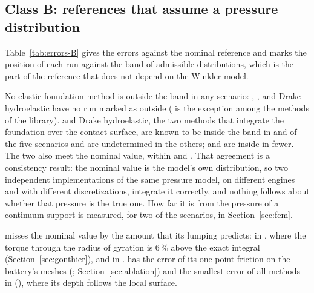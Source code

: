 \subsection{Class B: references that assume a pressure distribution}\label{sec:classB}

Table~\ref{tab:errors-B} gives the errors against the nominal reference and marks the position
of each run against the band of admissible distributions, which is the part of the reference
that does not depend on the Winkler model.

\begin{table}[t]
\caption{Class B: error [\%] against the nominal reference, base variant. Band: admissible
pressure distributions, in percent of the nominal stop time. $^\dagger$: the error exceeds the
wider side of the band, so the run is outside it; $^{*}$: it exceeds the narrower side only, so
its position is undetermined (the sign of the error was not recorded); unmarked errors are
inside. The columns of the native models are results of our configurations (Section~S3)}
\label{tab:errors-B}
\end{table}

No elastic-foundation method is outside the band in any scenario: ,
,  and Drake hydroelastic have no run marked as outside
( is the exception among the methods of the library). 
and Drake hydroelastic, the two methods that integrate the foundation over the contact surface,
are known to be inside the band in  and
 of the five scenarios and are undetermined in the others;
 and  are inside in fewer. The two also meet the nominal value, within
 and . That agreement is a consistency
result: the nominal value is the model's own distribution, so two independent implementations
of the same pressure model, on different engines and with different discretizations, integrate
it correctly, and nothing follows about whether that pressure is the true one. How far it is
from the pressure of a continuum support is measured, for two of the scenarios, in
Section~\ref{sec:fem}.

 misses the nominal value by the amount that its lumping predicts:
 in , where the torque through the radius of gyration is
6\,\% above the exact integral (Section~\ref{sec:gonthier}), and
 in .  has the error of its one-point
friction on the battery's meshes (; Section~\ref{sec:ablation}) and the
smallest error of all methods in  (), where its depth
follows the local surface.

